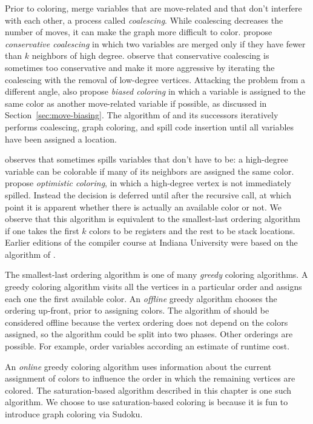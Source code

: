 \documentclass[11pt]{book}
\begin{document}
Prior to coloring, \citet{Chaitin:1981vl} merge variables that are
move-related and that don't interfere with each other, a process
called \emph{coalescing}. While coalescing decreases the number of
moves, it can make the graph more difficult to
color. \citet{Briggs:1994kx} propose \emph{conservative coalescing} in
which two variables are merged only if they have fewer than $k$
neighbors of high degree. \citet{George:1996aa} observe that
conservative coalescing is sometimes too conservative and make it more
aggressive by iterating the coalescing with the removal of low-degree
vertices.
%
Attacking the problem from a different angle, \citet{Briggs:1994kx}
also propose \emph{biased coloring} in which a variable is assigned to
the same color as another move-related variable if possible, as
discussed in Section~\ref{sec:move-biasing}.
%
The algorithm of \citet{Chaitin:1981vl} and its successors iteratively
performs coalescing, graph coloring, and spill code insertion until
all variables have been assigned a location.

\citet{Briggs:1994kx} observes that \citet{Chaitin:1982vn} sometimes
spills variables that don't have to be: a high-degree variable can be
colorable if many of its neighbors are assigned the same color.
\citet{Briggs:1994kx} propose \emph{optimistic coloring}, in which a
high-degree vertex is not immediately spilled. Instead the decision is
deferred until after the recursive call, at which point it is apparent
whether there is actually an available color or not. We observe that
this algorithm is equivalent to the smallest-last ordering
algorithm~\citep{Matula:1972aa} if one takes the first $k$ colors to
be registers and the rest to be stack locations.
Earlier editions of the compiler course at Indiana University
\citep{Dybvig:2010aa} were based on the algorithm of
\citet{Briggs:1994kx}.

The smallest-last ordering algorithm is one of many \emph{greedy}
coloring algorithms. A greedy coloring algorithm visits all the
vertices in a particular order and assigns each one the first
available color. An \emph{offline} greedy algorithm chooses the
ordering up-front, prior to assigning colors. The algorithm of
\citet{Chaitin:1981vl} should be considered offline because the vertex
ordering does not depend on the colors assigned, so the algorithm
could be split into two phases.  Other orderings are possible. For
example, \citet{Chow:1984ys} order variables according an estimate of
runtime cost.

An \emph{online} greedy coloring algorithm uses information about the
current assignment of colors to influence the order in which the
remaining vertices are colored. The saturation-based algorithm
described in this chapter is one such algorithm. We choose to use
saturation-based coloring is because it is fun to introduce graph
coloring via Sudoku.
\end{document}
